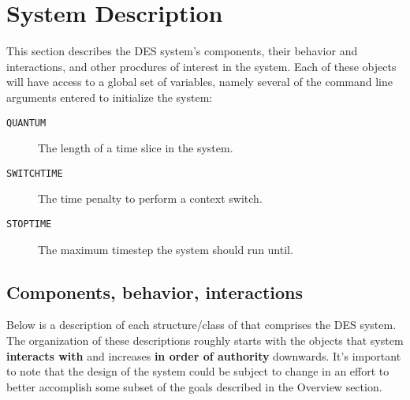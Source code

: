 \documentclass{article}
\begin{document}
\section*{System Description}
This section describes the DES system's components, their behavior and interactions, and other procdures of interest in the system. Each of these
objects will have access to a global set of variables, namely several of the command line arguments entered to initialize the system:
\begin{description}
    \item[\texttt{QUANTUM}]{The length of a time slice in the system.}
    \item[\texttt{SWITCHTIME}]{The time penalty to perform a context switch.}
    \item[\texttt{STOPTIME}]{The maximum timestep the system should run until.}
\end{description}
\subsection*{Components, behavior, interactions}
Below is a description of each structure/class of that comprises the DES system. The organization of these descriptions roughly starts with the
objects that system \textbf{interacts with} and increases \textbf{in order of authority} downwards. It's important to note that the design of the
system could be subject to change in an effort to better accomplish some subset of the goals described in the Overview section.
\end{document}
